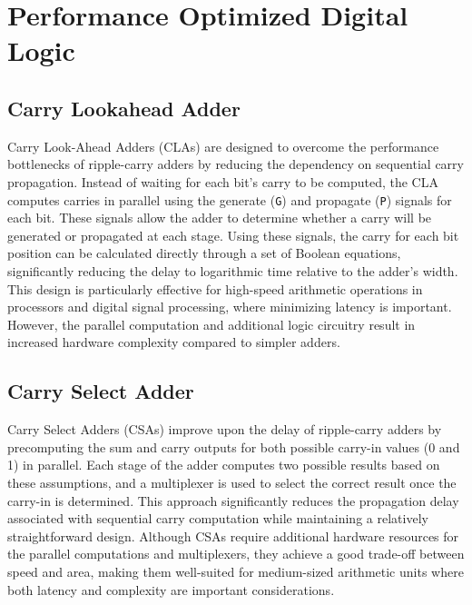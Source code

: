 \chapter{Performance Optimized Digital Logic}\label{chapt:perf_digital_logic}

\section{Carry Lookahead Adder}
Carry Look-Ahead Adders (CLAs) are designed to overcome the performance bottlenecks of ripple-carry adders by reducing the dependency on sequential carry propagation. Instead of waiting for each bit's carry to be computed, the CLA computes carries in parallel using the generate (\texttt{G}) and propagate (\texttt{P}) signals for each bit. These signals allow the adder to determine whether a carry will be generated or propagated at each stage. Using these signals, the carry for each bit position can be calculated directly through a set of Boolean equations, significantly reducing the delay to logarithmic time relative to the adder's width. This design is particularly effective for high-speed arithmetic operations in processors and digital signal processing, where minimizing latency is important. However, the parallel computation and additional logic circuitry result in increased hardware complexity compared to simpler adders.

\section{Carry Select Adder}
Carry Select Adders (CSAs) improve upon the delay of ripple-carry adders by precomputing the sum and carry outputs for both possible carry-in values (0 and 1) in parallel. Each stage of the adder computes two possible results based on these assumptions, and a multiplexer is used to select the correct result once the carry-in is determined. This approach significantly reduces the propagation delay associated with sequential carry computation while maintaining a relatively straightforward design. Although CSAs require additional hardware resources for the parallel computations and multiplexers, they achieve a good trade-off between speed and area, making them well-suited for medium-sized arithmetic units where both latency and complexity are important considerations.

